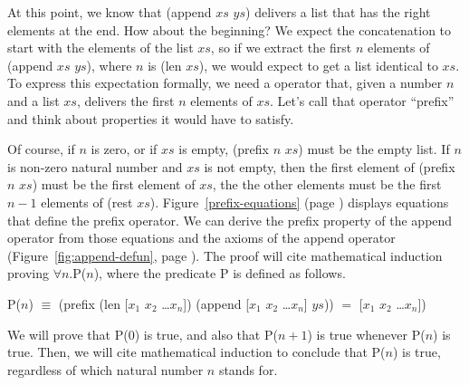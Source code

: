 At this point, we know that (append $xs$ $ys$) delivers
a list that has the right elements at the end.
How about the beginning?
We expect the concatenation to start with the elements of the list $xs$,
so if we extract the first $n$ elements of (append $xs$ $ys$), where $n$ is (len $xs$),
we would expect to get a list identical to $xs$.
To express this expectation formally, we need a operator that,
given a number $n$ and a list $xs$, delivers the first $n$ elements of $xs$.
Let's call that operator ``prefix'' and think about properties it would have to satisfy.

Of course, if $n$ is zero, or if $xs$ is empty,
(prefix $n$ $xs$) must be the empty list.
If $n$ is non-zero natural number and $xs$ is not empty,
then the first element of (prefix $n$ $xs$) must be the first element of $xs$,
the the other elements must be the first $n-1$ elements of (rest $xs$).
Figure~\ref{prefix-equations} (page \pageref{prefix-equations}) displays
equations that define the prefix operator.
We can derive the prefix property of the append operator
from those equations and the axioms of the append operator
(Figure~\ref{fig:append-defun}, page \pageref{fig:append-defun}).
The proof will cite mathematical induction proving $\forall n.$P($n$),
where the predicate P is defined as follows.

\begin{samepage}
\begin{center}
P($n$) $\equiv$ (prefix (len [$x_1$ $x_2$ \dots $x_n$]) (append [$x_1$ $x_2$ \dots $x_n$] $ys$))
                $=$ [$x_1$ $x_2$ \dots $x_n$])
\end{center}
\end{samepage}

We will prove that P(0) is true, and also that P($n+1$) is true whenever P($n$) is true. Then, we will cite mathematical induction to conclude that P($n$) is true, regardless of which natural number $n$ stands for.

